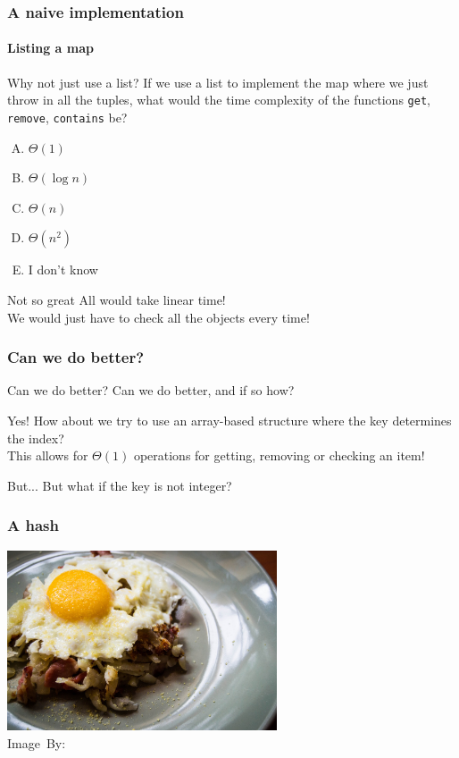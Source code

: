 \begin{frame}
	\frametitle{A naive implementation}
	\framesubtitle{Listing a map}

	\begin{block}{Why not just use a list?}
		If we use a list to implement the map where we just throw in all the tuples, what would the time complexity
		of the functions \texttt{get}, \texttt{remove}, \texttt{contains} be?
		\pause
		\begin{enumerate}[A.]
			\item $\Theta(1)$
			\item $\Theta(\log n)$
			\item $\Theta(n)$
			\item $\Theta(n^2)$
			\item I don't know
		\end{enumerate}
	\end{block}
	\pause
	\begin{block}{Not so great}
		All would take linear time! \\
		We would just have to check all the objects every time!
	\end{block}
\end{frame}

\begin{frame}
	\frametitle{Can we do better?}
	\begin{block}{Can we do better?} 
		Can we do better, and if so how?
	\end{block}	
	\pause
	\begin{block}{Yes!}
		How about we try to use an array-based structure where the key determines the index?\\
		\pause
		This allows for $\Theta(1)$ operations for getting, removing or checking an item!
	\end{block}
	\pause
	\begin{block}{But...}
		But what if the key is not integer?
	\end{block}
\end{frame}


\begin{frame}
	\frametitle{A hash}
\begin{center}
	\includegraphics[width=0.6\textwidth]{images/hash.jpg}\\
	\hspace*{15pt}\hbox{\scriptsize Image By:}
\end{center}
\end{frame}

